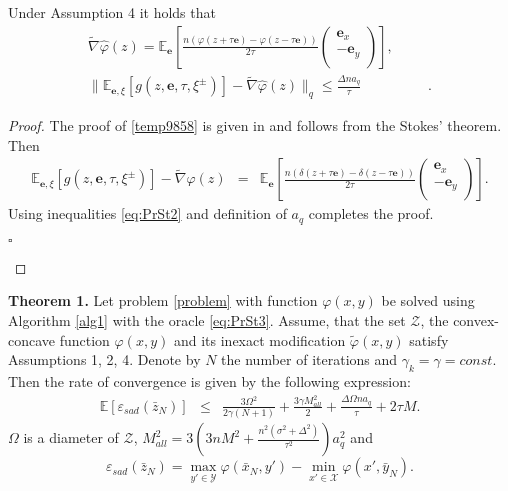 \documentclass[runningheads]{llncs}
\newcommand{\EndProof}{\begin{flushright}$\square$\end{flushright}}
\begin{document}
\begin{lemma}
    Under Assumption 4 it holds that 
    \begin{eqnarray}
    \label{temp9858}
    \tilde \nabla \hat{\varphi}(z) = \mathbb{E}_{\mathbf{e}}\left[\frac{n\left(\varphi(z + \tau \mathbf{e}) -  \varphi(z - \tau \mathbf{e})\right)}{2\tau}\left(
    \begin{array}{c}
    \mathbf{e}_x\\
    -\mathbf{e}_y \\
    \end{array}\right)\right],\\
    \|\mathbb{E}_{\mathbf{e},\xi}[ g(z, \mathbf{e}, \tau, \xi^{\pm}) ] - \tilde \nabla \hat{\varphi}(z)\|_q \leq \frac{\Delta n a_q}{\tau}\nonumber\hspace{2cm}.
    \end{eqnarray}
\end{lemma}
\begin{proof}
    The proof of \eqref{temp9858} is given in \cite{Shamir15} and follows from the Stokes' theorem.
    Then 
    \begin{eqnarray*}
    \mathbb{E}_{\mathbf{e},\xi}[ g(z, \mathbf{e}, \tau, \xi^{\pm}) ] - \tilde \nabla \hat{\varphi}(z) &=&  \mathbb{E}_{\mathbf{e}} \left[ \frac{n \left(\delta(z + \tau \mathbf{e}) -  \delta(z - \tau \mathbf{e})\right)}{2\tau}\left(\begin{array}{c}
    \mathbf{e}_x\\
    -\mathbf{e}_y \\
    \end{array}
    \right)\right].
    \end{eqnarray*}
    Using inequalities \eqref{eq:PrSt2} and definition of $a_q$ completes the proof.
    \EndProof
\end{proof}

\textbf{Theorem 1.}
Let problem \eqref{problem} with function $\varphi(x,y)$ be solved using Algorithm \ref{alg1} with the oracle \eqref{eq:PrSt3}. Assume, that the set $\mathcal{Z}$, the convex-concave function $\varphi(x,y)$ and its inexact modification $\widetilde{\varphi}(x,y)$ satisfy Assumptions 1, 2, 4. Denote by $N$ the number of iterations and $\gamma_k = \gamma = const$. Then the rate of convergence is given by the following expression:
\begin{eqnarray*}
    \mathbb{E}\left[\varepsilon_{sad}(\bar z_{N})\right] &\leq&
    \frac{3\Omega^2}{2 \gamma (N+1)} + \frac{3\gamma M^2_{all}}{2} + \frac{\Delta \Omega n a_q}{\tau} + 2\tau M.
\end{eqnarray*} 
$\Omega$ is a diameter of $\mathcal{Z}$, $M^2_{all} = 3\left(3n M^2 +\frac{n^2(\sigma^2 + \Delta^2)}{\tau^2}\right)a^2_q$ and 
\begin{equation*}
    \varepsilon_{sad}(\bar z_{N}) = \max_{y' \in \mathcal{Y}} \varphi(\bar x_{N}, y') - \min_{x' \in \mathcal{X}} \varphi(x', \bar y_{N}).
\end{equation*}
\end{document}
